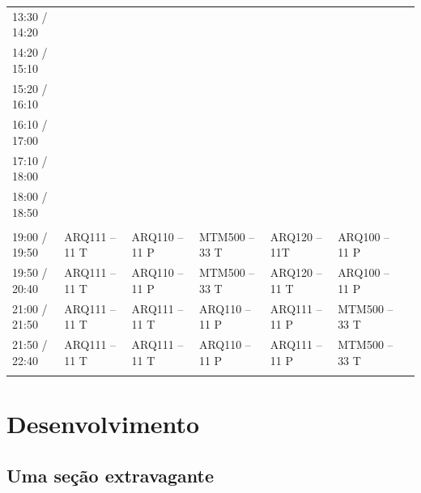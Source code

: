 \documentclass[
	12pt,				%
	openright,			%
	oneside,			%
	a4paper,			%
	english,			%
	brazil				%
	]{abntex2}
\begin{document}
\begin{landscape}
\begin{table}[p]
{\begin{tabular}{lllllll}
				13:30 / 14:20 &               &               &                         &                                      &               &  \\
				14:20 / 15:10 &               &               &                         &                                      &               &  \\
				15:20 / 16:10 &               &               &                         &                                      &               &  \\
				16:10 / 17:00 &               &               &                         &                                      &               &  \\
				17:10 / 18:00 &               &               & {\color[HTML]{FF0000} } &                                      &               &  \\
				18:00 / 18:50 &               &               & {\color[HTML]{FF0000} } &                                      &               &  \\
				\multicolumn{7}{l}{\cellcolor[HTML]{D9D9D9}}                                                                                      \\
				19:00 / 19:50 & ARQ111 – 11 T & ARQ110 – 11 P & MTM500 – 33 T           & {\color[HTML]{434343} ARQ120 – 11T}  & ARQ100 – 11 P &  \\
				19:50 / 20:40 & ARQ111 – 11 T & ARQ110 – 11 P & MTM500 – 33 T           & {\color[HTML]{434343} ARQ120 – 11 T} & ARQ100 – 11 P &  \\
				21:00 / 21:50 & ARQ111 – 11 T & ARQ111 – 11 T & ARQ110 – 11 P           & ARQ111 – 11 P                        & MTM500 – 33 T &  \\
				21:50 / 22:40 & ARQ111 – 11 T & ARQ111 – 11 T & ARQ110 – 11 P           & ARQ111 – 11 P                        & MTM500 – 33 T &  \\
				\multicolumn{7}{l}{\cellcolor[HTML]{D9D9D9}}                                                                                     
			\end{tabular}%
		}
	\end{table}
\end{landscape}
\chapter{Desenvolvimento} \label{cap:desenvolvimento}

\section{Uma seção extravagante}
\end{document}
